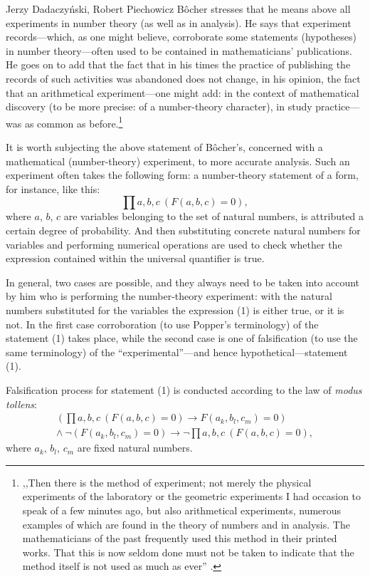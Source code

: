 \begin{artengenv}{Jerzy Dadaczyński, Robert Piechowicz}
Bôcher stresses that he means above all experiments in number theory (as well as in analysis). He says that experiment records---which, as one might believe, corroborate some statements (hypotheses) in number theory---often used to be contained in mathematicians' publications. He goes on to add that the fact that in his times the practice of publishing the records of such activities was abandoned does not change, in his opinion, the fact that an arithmetical experiment---one might add: in the context of mathematical discovery (to be more precise: of a number-theory character), in study practice---was as common as before.\footnote{,,Then there is the method of experiment; not merely the physical experiments of the laboratory or the geometric experiments I had occasion to speak of a few minutes ago, but also arithmetical experiments, numerous examples of which are found in the theory of numbers and in analysis. The mathematicians of the past frequently used this method in their printed works. That this is now seldom done must not be taken to indicate that the method itself is not used as much as ever''
\parencite[][p.134]{bocher_fundamental_1904}.%
}

It is worth subjecting the above statement of Bôcher's, concerned with a mathematical (number-theory) experiment, to more accurate analysis. Such an experiment often takes the following form: a number-theory statement of a form, for instance, like this:
\begin{equation}
\prod a,b,c\ (F(a,b,c) = 0),
\end{equation}
where $a$, $b$, $c$ are variables belonging to the set of natural numbers, is attributed a certain degree of probability. And then substituting concrete natural numbers for variables and performing numerical operations are used to check whether the expression contained within the universal quantifier is true.

In general, two cases are possible, and they always need to be taken into account by him who is performing the number-theory experiment: with the natural numbers substituted for the variables the expression (1) is either true, or it is not. In the first case corroboration (to use Popper's terminology) of the statement (1) takes place, while the second case is one of falsification (to use the same terminology) of the ``experimental''---and hence hypothetical---statement (1).

Falsification process for statement (1) is conducted according to the law of \textit{modus tollens}:
\begin{equation}
\begin{split}
(\prod a,b,c\ (F(a,b,c) = 0) \to F(a_{k}, b_{l}, c_{m}) = 0)\\
\land\ \neg (F(a_{k}, b_{l}, c_{m}) = 0)
\to \neg \prod a,b,c\ (F(a,b,c) = 0),
\end{split}
\end{equation}
where $a_{k}$, $b_{l}$, $c_{m}$ are fixed natural numbers.


\end{artengenv}
